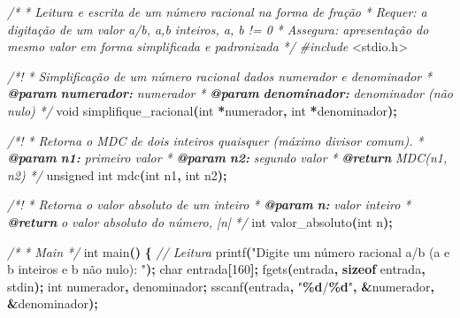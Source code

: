 \documentclass[
  11pt,
  a4paper,
]{scrbook}
\newenvironment{Shaded}{\begin{snugshade}}{\end{snugshade}}
\newcommand{\AnnotationTok}[1]{\textcolor[rgb]{0.56,0.35,0.01}{\textbf{\textit{#1}}}}
\newcommand{\CommentTok}[1]{\textcolor[rgb]{0.56,0.35,0.01}{\textit{#1}}}
\newcommand{\CommentVarTok}[1]{\textcolor[rgb]{0.56,0.35,0.01}{\textbf{\textit{#1}}}}
\newcommand{\DataTypeTok}[1]{\textcolor[rgb]{0.13,0.29,0.53}{#1}}
\newcommand{\DecValTok}[1]{\textcolor[rgb]{0.00,0.00,0.81}{#1}}
\newcommand{\ImportTok}[1]{#1}
\newcommand{\KeywordTok}[1]{\textcolor[rgb]{0.13,0.29,0.53}{\textbf{#1}}}
\newcommand{\NormalTok}[1]{#1}
\newcommand{\OperatorTok}[1]{\textcolor[rgb]{0.81,0.36,0.00}{\textbf{#1}}}
\newcommand{\PreprocessorTok}[1]{\textcolor[rgb]{0.56,0.35,0.01}{\textit{#1}}}
\newcommand{\SpecialCharTok}[1]{\textcolor[rgb]{0.81,0.36,0.00}{\textbf{#1}}}
\newcommand{\StringTok}[1]{\textcolor[rgb]{0.31,0.60,0.02}{#1}}
\begin{document}
\begin{Shaded}
\begin{Highlighting}[]
\CommentTok{/*}
\CommentTok{ * Leitura e escrita de um número racional na forma de fração}
\CommentTok{ * Requer: a digitação de um valor a/b, a,b inteiros, a, b != 0}
\CommentTok{ * Assegura: apresentação do mesmo valor em forma simplificada e padronizada}
\CommentTok{ */}
\PreprocessorTok{\#include }\ImportTok{\textless{}stdio.h\textgreater{}}

\CommentTok{/*!}
\CommentTok{ * Simplificação de um número racional dados numerador e denominador}
\CommentTok{ * }\AnnotationTok{@param}\CommentTok{ }\CommentVarTok{numerador:}\CommentTok{ numerador}
\CommentTok{ * }\AnnotationTok{@param}\CommentTok{ }\CommentVarTok{denominador:}\CommentTok{ denominador (não nulo)}
\CommentTok{ */}
\DataTypeTok{void}\NormalTok{ simplifique\_racional}\OperatorTok{(}\DataTypeTok{int} \OperatorTok{*}\NormalTok{numerador}\OperatorTok{,} \DataTypeTok{int} \OperatorTok{*}\NormalTok{denominador}\OperatorTok{);}

\CommentTok{/*!}
\CommentTok{ * Retorna o MDC de dois inteiros quaisquer (máximo divisor comum).}
\CommentTok{ * }\AnnotationTok{@param}\CommentTok{ }\CommentVarTok{n1:}\CommentTok{ primeiro valor}
\CommentTok{ * }\AnnotationTok{@param}\CommentTok{ }\CommentVarTok{n2:}\CommentTok{ segundo valor}
\CommentTok{ * }\AnnotationTok{@return}\CommentTok{ MDC(n1, n2)}
\CommentTok{ */}
\DataTypeTok{unsigned} \DataTypeTok{int}\NormalTok{ mdc}\OperatorTok{(}\DataTypeTok{int}\NormalTok{ n1}\OperatorTok{,} \DataTypeTok{int}\NormalTok{ n2}\OperatorTok{);}

\CommentTok{/*!}
\CommentTok{ * Retorna o valor absoluto de um inteiro}
\CommentTok{ * }\AnnotationTok{@param}\CommentTok{ }\CommentVarTok{n:}\CommentTok{ valor inteiro}
\CommentTok{ * }\AnnotationTok{@return}\CommentTok{ o valor absoluto do número, |n|}
\CommentTok{ */}
\DataTypeTok{int}\NormalTok{ valor\_absoluto}\OperatorTok{(}\DataTypeTok{int}\NormalTok{ n}\OperatorTok{);}

\CommentTok{/*}
\CommentTok{ * Main}
\CommentTok{ */}
\DataTypeTok{int}\NormalTok{ main}\OperatorTok{()} \OperatorTok{\{}
    \CommentTok{// Leitura}
\NormalTok{    printf}\OperatorTok{(}\StringTok{"Digite um número racional a/b (a e b inteiros e b não nulo): "}\OperatorTok{);}
    \DataTypeTok{char}\NormalTok{ entrada}\OperatorTok{[}\DecValTok{160}\OperatorTok{];}
\NormalTok{    fgets}\OperatorTok{(}\NormalTok{entrada}\OperatorTok{,} \KeywordTok{sizeof}\NormalTok{ entrada}\OperatorTok{,}\NormalTok{ stdin}\OperatorTok{);}
    \DataTypeTok{int}\NormalTok{ numerador}\OperatorTok{,}\NormalTok{ denominador}\OperatorTok{;}
\NormalTok{    sscanf}\OperatorTok{(}\NormalTok{entrada}\OperatorTok{,} \StringTok{"}\SpecialCharTok{\%d}\StringTok{/}\SpecialCharTok{\%d}\StringTok{"}\OperatorTok{,} \OperatorTok{\&}\NormalTok{numerador}\OperatorTok{,} \OperatorTok{\&}\NormalTok{denominador}\OperatorTok{);}


\end{Highlighting}
\end{Shaded}
\end{document}
